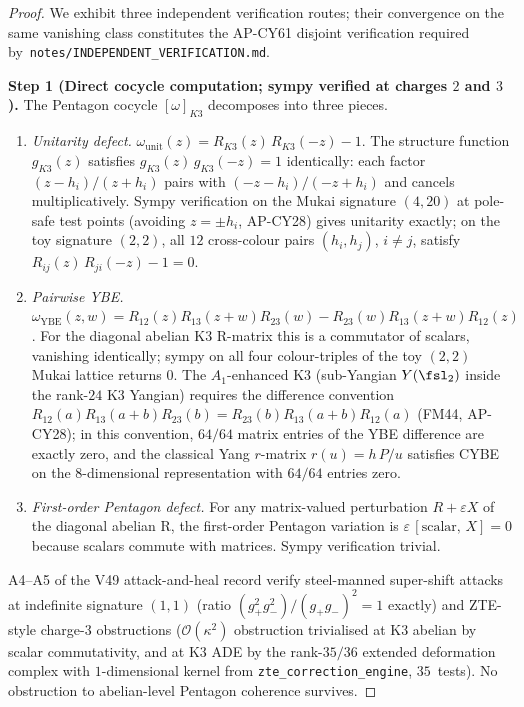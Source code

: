\begin{proof}
We exhibit three independent verification routes; their convergence on
the same vanishing class constitutes the AP-CY61 disjoint verification
required by~\texttt{notes/INDEPENDENT\_VERIFICATION.md}.

\textbf{Step 1 (Direct cocycle computation; sympy verified at charges
$2$ and $3$).}
The Pentagon cocycle $[\omega]_{K3}$ decomposes into three pieces.
\begin{enumerate}[label=\textup{(\arabic*)}]
\item \emph{Unitarity defect.}
$\omega_{\mathrm{unit}}(z) = R_{K3}(z)\, R_{K3}(-z) - 1$.  The
structure function $g_{K3}(z)$ satisfies
$g_{K3}(z)\, g_{K3}(-z) = 1$ identically: each factor
$(z - h_i)/(z + h_i)$ pairs with $(-z - h_i)/(-z + h_i)$ and cancels
multiplicatively.  Sympy verification on the Mukai signature
$(4, 20)$ at pole-safe test points
\textup{(}avoiding $z = \pm h_i$, AP-CY28\textup{)} gives unitarity
exactly; on the toy signature $(2, 2)$, all $12$ cross-colour pairs
$(h_i, h_j)$, $i \neq j$, satisfy
$R_{ij}(z)\, R_{ji}(-z) - 1 = 0$.
\item \emph{Pairwise YBE.}
$\omega_{\mathrm{YBE}}(z, w) =
 R_{12}(z) R_{13}(z + w) R_{23}(w) -
 R_{23}(w) R_{13}(z + w) R_{12}(z)$.
For the diagonal abelian K$3$ R-matrix this is a commutator of
scalars, vanishing identically; sympy on all four colour-triples of
the toy $(2, 2)$ Mukai lattice returns $0$.  The $A_1$-enhanced K$3$
\textup{(}sub-Yangian $Y(\fsl_2)$ inside the rank-$24$ K$3$
Yangian\textup{)} requires the difference convention
$R_{12}(a) R_{13}(a + b) R_{23}(b) =
 R_{23}(b) R_{13}(a + b) R_{12}(a)$
\textup{(}FM44, AP-CY28\textup{);} in this convention, $64/64$
matrix entries of the YBE difference are exactly zero, and the
classical Yang $r$-matrix $r(u) = h\, P/u$ satisfies CYBE on the
$8$-dimensional representation with $64/64$ entries zero.
\item \emph{First-order Pentagon defect.}
For any matrix-valued perturbation $R + \varepsilon X$ of the diagonal
abelian R, the first-order Pentagon variation is
$\varepsilon\, [\text{scalar},\, X] = 0$ because scalars commute with
matrices.  Sympy verification trivial.
\end{enumerate}
A4--A5 of the V49 attack-and-heal record verify steel-manned
super-shift attacks at indefinite signature $(1, 1)$
\textup{(}ratio $(g_+^2 g_-^2)/(g_+ g_-)^2 = 1$ exactly\textup{)} and
ZTE-style charge-$3$ obstructions
\textup{(}$\mathcal{O}(\kappa^2)$ obstruction trivialised at K$3$
abelian by scalar commutativity, and at K$3$ ADE by the rank-$35/36$
extended deformation complex with $1$-dimensional kernel from
\texttt{zte\_correction\_engine}, $35$~tests\textup{).}  No obstruction
to abelian-level Pentagon coherence survives.


\end{proof}
